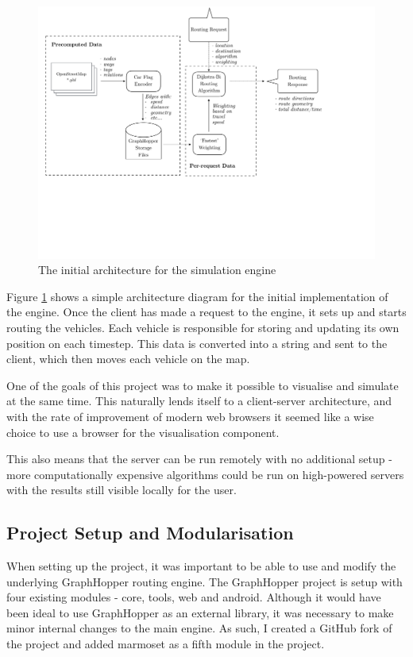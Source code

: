 \documentclass[ %
                    author={Alexander Hill},
                supervisor={Dr. Benjamin Sach},
                    degree={MEng},
                     title={MARMOSET},
                  subtitle={Multi-Agent Route Management using Online Simulation for Efficient Transportation},
                      type={research},
                      year={2016} ]{dissertation}
\begin{document}
\begin{figure}[h]
    \centering
    \includegraphics[scale=0.5,page=2,clip,trim=0 17cm 3cm 0]{architecture}
    \caption{The initial architecture for the simulation engine}\label{fig:init-arch}
\end{figure}

Figure \ref{fig:init-arch} shows a simple architecture diagram for the initial
implementation of the engine. Once the client has made a request to the engine,
it sets up and starts routing the vehicles. Each vehicle is responsible for
storing and updating its own position on each timestep. This data is converted
into a string and sent to the client, which then moves each vehicle on the map.

One of the goals of this project was to make it possible to visualise and
simulate at the same time. This naturally lends itself to a client-server
architecture, and with the rate of improvement of modern web browsers it seemed
like a wise choice to use a browser for the visualisation component.

This also means that the server can be run remotely with no additional setup -
more computationally expensive algorithms could be run on high-powered servers
with the results still visible locally for the user.

\subsection{Project Setup and Modularisation}

When setting up the project, it was important to be able to use and modify the
underlying GraphHopper routing engine. The GraphHopper project is setup with
four existing modules - core, tools, web and android. Although it would have
been ideal to use GraphHopper as an external library, it was necessary to make
minor internal changes to the main engine. As such, I created a GitHub fork of
the project and added marmoset as a fifth module in the project.
\end{document}
